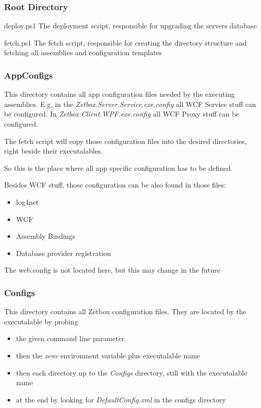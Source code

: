 \subsubsection{Root Directory}
\begin{descriptionBorder}
\item[deploy.ps1] The deployment script, responsible for upgrading the servers
database

\item[fetch.ps1] The fetch script, responsible for creating the directory
structure and fetching all assemblies and configuration templates
\end{descriptionBorder}

\subsubsection{AppConfigs}
This directory contains all app configuration files needed by the executing
assemblies. E.g. in the \emph{Zetbox.Server.Service.exe.config} all WCF Service
stuff can be configured. In \emph{Zetbox.Client.WPF.exe.config} all WCF Proxy
stuff can be configured.

The fetch script will copy those configuration files into the desired
directories, right beside their executalables.

So this is the place where all app specific configuration has to be defined.

Besides WCF stuff, those configuration can be also found in those files:

\begin{itemize}
  \item log4net
  \item WCF
  \item Assembly Bindings
  \item Database provider registration 
\end{itemize} 

\begin{note}
The web.config is not located here, but this may change in the
future
\end{note}

\subsubsection{Configs}
This directory contains all Zetbox configuration files. They are located by the
executalable by probing 
\begin{itemize}
  \item the given command line parameter
  \item then the \emph{zenv} environment variable plus executalable name
  \item then each directory up to the \emph{Configs} directory, still with the
  executalable name
  \item at the end by looking for \emph{DefaultConfig.xml} in the configs
  directory
\end{itemize}

